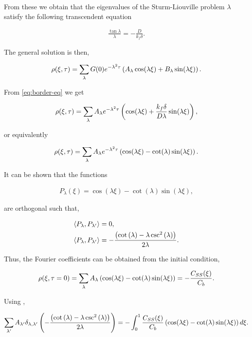 From these we obtain that the eigenvalues of the Sturm-Liouville problem $\lambda$ satisfy the following transcendent equation

\begin{align}
	\frac{\tan\lambda}{\lambda} = -\frac{D}{k_f\delta}.
	\label{eq:lambda-equation}
\end{align}

The general solution is then,

\begin{align}
	\rho(\xi,\tau) = \sum_\lambda G(0)e^{-\lambda^2 \tau}\left({ A_\lambda \cos(\lambda\xi) + B_\lambda \sin(\lambda\xi)}\right).
\end{align}

From \ref{eq:border-eq} we get

\begin{align}
	\rho(\xi,\tau) = \sum_\lambda A_\lambda e^{-\lambda^2 \tau}\left({  \cos(\lambda\xi) + \frac{k_f \delta}{D\lambda} \sin(\lambda\xi)}\right),
\end{align}

or equivalently

\begin{align}
	\rho(\xi,\tau) = \sum_\lambda A_\lambda e^{-\lambda^2 \tau}\left({  \cos(\lambda\xi) - \cot(\lambda)\sin(\lambda\xi)}\right).
\end{align}

It can be shown that the functions 

\begin{align}
	P_\lambda(\xi) = \cos(\lambda\xi) - \cot(\lambda)\sin(\lambda\xi),
\end{align}

are orthogonal such that,

\begin{align}
	\left< P_\lambda , P_{\lambda'}\right> &= 0, \\
	\left< P_\lambda , P_{\lambda'}\right> &= -\frac{\left({\cot\left({\lambda}\right) -  \lambda \csc^2\left({\lambda}\right)}\right)}{2\lambda}.
\end{align}

Thus, the Fourier coefficients can be obtained from the initial condition,
 

\begin{align}
	\rho(\xi,\tau = 0) = \sum_\lambda A_\lambda \left({  \cos(\lambda\xi) - \cot(\lambda)\sin(\lambda\xi)}\right) = -\frac{C_{SS}(\xi)}{C_b}.
\end{align}


Using \label{eq:orthogonality}, 

\begin{align}
\sum_{\lambda'} A_{\lambda'} \delta_{\lambda, \lambda'}\left({-\frac{\left({\cot\left({\lambda}\right) -  \lambda \csc^2\left({\lambda}\right)}\right)}{2\lambda} }\right)= -\int_0^1 \frac{C_{SS}(\xi)}{C_b}\left({\cos(\lambda \xi) - \cot(\lambda) \sin(\lambda\xi)}\right)d\xi.
\end{align}




